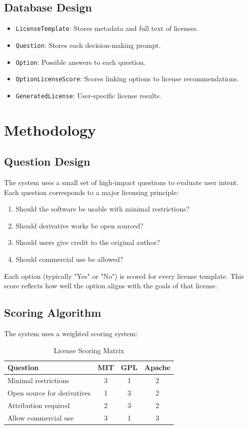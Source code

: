 \documentclass[12pt,a4paper]{report}
\begin{document}
\section{Database Design}
\begin{itemize}
    \item \texttt{LicenseTemplate}: Stores metadata and full text of licenses.
    \item \texttt{Question}: Stores each decision-making prompt.
    \item \texttt{Option}: Possible answers to each question.
    \item \texttt{OptionLicenseScore}: Scores linking options to license recommendations.
    \item \texttt{GeneratedLicense}: User-specific license results.
\end{itemize}

\chapter{Methodology}
\section{Question Design}
The system uses a small set of high-impact questions to evaluate user intent. Each question corresponds to a major licensing principle:

\begin{enumerate}
    \item Should the software be usable with minimal restrictions?
    \item Should derivative works be open sourced?
    \item Should users give credit to the original author?
    \item Should commercial use be allowed?
\end{enumerate}

Each option (typically "Yes" or "No") is scored for every license template. This score reflects how well the option aligns with the goals of that license.

\section{Scoring Algorithm}
The system uses a weighted scoring system:

\begin{table}[h]
    \centering
    \begin{tabular}{lccc}
        \toprule
        Question                    & MIT & GPL & Apache \\
        \midrule
        Minimal restrictions        & 3   & 1   & 2      \\
        Open source for derivatives & 1   & 3   & 2      \\
        Attribution required        & 2   & 3   & 2      \\
        Allow commercial use        & 3   & 1   & 3      \\
        \bottomrule
    \end{tabular}
    \caption{License Scoring Matrix}
\end{table}
\end{document}

